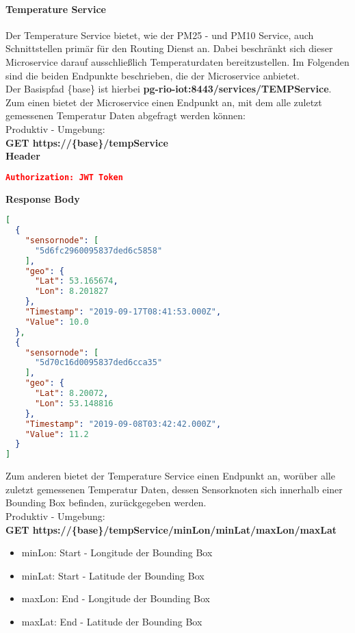 \paragraph{Temperature Service}
Der Temperature Service bietet, wie der PM25 - und PM10 Service, auch Schnittstellen primär für den Routing Dienst an.
Dabei beschränkt sich dieser Microservice darauf ausschließlich Temperaturdaten bereitzustellen.
Im Folgenden sind die beiden Endpunkte beschrieben, die der Microservice anbietet.
\\
Der Basispfad \{base\} ist hierbei \textbf{pg-rio-iot:8443/services/TEMPService}.
\newline
Zum einen bietet der Microservice einen Endpunkt an, mit dem alle zuletzt gemessenen Temperatur Daten abgefragt werden können:
\newline
\\
Produktiv - Umgebung:
\\
\textbf{GET https://\{base\}/tempService}
\\
\textbf{Header}
\begin{lstlisting}[language=json,firstnumber=1,basicstyle=\footnotesize]
Authorization: JWT Token
\end{lstlisting}
\textbf{Response Body}
\begin{lstlisting}[language=json,firstnumber=1,basicstyle=\footnotesize]
[
  {
    "sensornode": [
      "5d6fc2960095837ded6c5858"
    ],
    "geo": {
      "Lat": 53.165674,
      "Lon": 8.201827
    },
    "Timestamp": "2019-09-17T08:41:53.000Z",
    "Value": 10.0
  },
  {
    "sensornode": [
      "5d70c16d0095837ded6cca35"
    ],
    "geo": {
      "Lat": 8.20072,
      "Lon": 53.148816
    },
    "Timestamp": "2019-09-08T03:42:42.000Z",
    "Value": 11.2
  }
]
\end{lstlisting} 
Zum anderen bietet der Temperature Service einen Endpunkt an, worüber alle zuletzt gemessenen Temperatur Daten, dessen Sensorknoten sich innerhalb einer Bounding Box befinden, zurückgegeben werden.
\\
Produktiv - Umgebung:
\\
\textbf{GET https://\{base\}/tempService/minLon/minLat/maxLon/maxLat}
\begin{itemize}
	\item minLon: Start - Longitude der Bounding Box
	\item minLat: Start - Latitude der Bounding Box
	\item maxLon: End - Longitude der Bounding Box
	\item maxLat: End - Latitude der Bounding Box
\end{itemize}
